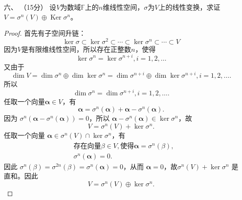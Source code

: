 \begin{enumerate}[1~]
\item[六、]（15分）
设$V$为数域$\mathbb{F}$上的$n$维线性空间，$\sigma$为$V$上的线性变换，求证$V = \sigma ^ { n } ( V ) \oplus \operatorname { Ker } \sigma ^ { n }$。
\begin{proof}
首先有子空间升链：\[
\ker\sigma \subset \ker\sigma ^2\subset \cdots \subset \ker\sigma ^n\subset \cdots \subset V
\]
因为$V$是有限维线性空间，所以存在正整数$n$，使得\[
\ker \sigma^n=\ker \sigma^{n+i}, i=1, 2, \dots
\]
又由于\[
\dim V=\dim \sigma^n\oplus \dim \ker \sigma^n=\dim\sigma^{n+i}\oplus\dim\ker\sigma^{n+i}, i=1, 2, \dots.
\]
所以\[
\dim\sigma^n=\dim \sigma^{n+i}, i=1, 2, \dots.
\]
任取一个向量$\boldsymbol{\alpha} \in V$，有\[
\boldsymbol{\alpha}=\sigma^n(\boldsymbol{\alpha})+\boldsymbol{\alpha}-\sigma^n (\boldsymbol{\alpha}).
\]
因为 $\sigma^n \left(\boldsymbol{\alpha}-\sigma^n (\boldsymbol{\alpha})\right)=0$，所以 $\boldsymbol{\alpha}-\sigma^n (\boldsymbol{\alpha})\in \ker \sigma^n$，故\[
V=\sigma^n(V)+\ker \sigma^n.
\]
任取一个向量 $\boldsymbol{\alpha} \in \sigma^n(V)\cap\ker \sigma^n$，有\begin{align*}
& \text{存在向量}\beta\in V, \text{使得} \boldsymbol{\alpha}=\sigma^n(\beta),\\
& \sigma^n(\boldsymbol{\alpha})=0.
\end{align*}
因此 $\sigma^n(\beta)=\sigma^{2n}(\beta)=\sigma^n (\boldsymbol{\alpha})=0$，从而 $\boldsymbol{\alpha}=0$，故$\sigma^n(V)+\ker \sigma^n$ 是直和。因此\[
V=\sigma^n(V)\oplus\ker \sigma^n.
\]
\end{proof}



\end{enumerate}
